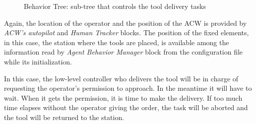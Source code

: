 \begin{figure}[ht]
\begin{center}
{}
		\caption{Behavior Tree: sub-tree that controls the tool delivery tasks}
		\label{fig:DeliverToolTree}
	\end{center}
\end{figure}

Again, the location of the operator and the position of the \gls{ACW} is provided by \emph{\gls{ACW}'s autopilot} and \emph{Human Tracker} blocks. The position of the fixed elements, in this case, the station where the tools are placed, is available among the information read by \emph{Agent Behavior Manager} block from the configuration file while its initialization.

In this case, the low-level controller who delivers the tool will be in charge of requesting the operator's permission to approach. In the meantime it will have to wait. When it gets the permission, it is time to make the delivery. If too much time elapses without the operator giving the order, the task will be aborted and the tool will be returned to the station.

